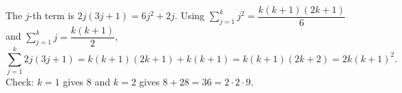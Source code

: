 The $j$-th term is $2j(3j+1)=6j^2+2j$. Using $\sum_{j=1}^k j^2=\dfrac{k(k+1)(2k+1)}{6}$ and $\sum_{j=1}^k j=\dfrac{k(k+1)}{2}$,
\[
\sum_{j=1}^{k}2j(3j+1)=k(k+1)(2k+1)+k(k+1)=k(k+1)(2k+2)=\boxed{2k(k+1)^2}.
\]
Check: $k=1$ gives $8$ and $k=2$ gives $8+28=36=2\cdot2\cdot9$.
